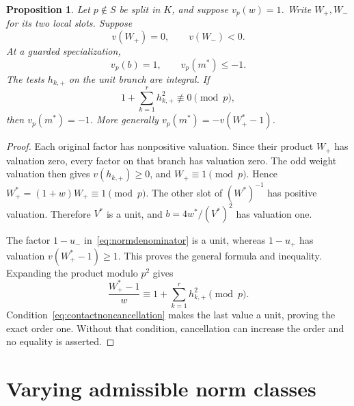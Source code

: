 \documentclass[11pt,a4paper]{article}
\newtheorem{proposition}[theorem]{Proposition}
\theoremstyle{definition}\newtheorem{definition}[theorem]{Definition}
\begin{document}
\begin{proposition}\label{prop:contact}
Let $p\notin S$ be split in $K$, and suppose $v_p(w)=1$.
Write $W_+,W_-$ for its two local slots. Suppose
\[
                         v(W_+)=0,\qquad v(W_-)<0.
\]
At a guarded specialization,
\[
             v_p(b)=1,\qquad v_p(m^*)\le-1.
\]
The tests $h_{k,+}$ on the unit branch are integral. If
\begin{equation}\label{eq:contactnoncancellation}
                     1+\sum_{k=1}^{r}h_{k,+}^2
                              \not\equiv0\pmod p,
\end{equation}
then $v_p(m^*)=-1$. More generally
$v_p(m^*)=-v(W_+^*-1)$.
\end{proposition}
\begin{proof}
Each original factor has nonpositive valuation. Since their product
$W_+$ has valuation zero, every factor on that branch has valuation
zero. The odd weight valuation then gives $v(h_{k,+})\ge0$,
and $W_+\equiv1\pmod p$. Hence
$W_+^*=(1+w)W_+\equiv1\pmod p$. The other slot of
$(W^*)^{-1}$ has positive valuation. Therefore $V^*$ is a unit,
and $b=4w^*/(V^*)^2$ has valuation one.

The factor $1-u_-$ in~\eqref{eq:normdenominator} is a unit,
whereas $1-u_+$ has valuation $v(W_+^*-1)\ge1$.
This proves the general formula and inequality. Expanding the
product modulo $p^2$ gives
\[
               \frac{W_+^*-1}{w}
                   \equiv1+\sum_{k=1}^{r}h_{k,+}^2\pmod p.
\]
Condition~\eqref{eq:contactnoncancellation} makes the last value
a unit, proving the exact order one. Without that condition,
cancellation can increase the order and no equality is asserted.
\end{proof}

\section{Varying admissible norm classes}\label{sec:classes}
\end{document}
